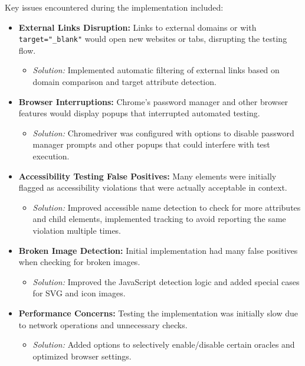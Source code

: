 Key issues encountered during the implementation included:

\begin{itemize}
    \item \textbf{External Links Disruption:} Links to external domains or with \texttt{target="\_blank"} would open new websites or tabs, disrupting the testing flow.
    \begin{itemize}
        \item \textit{Solution:} Implemented automatic filtering of external links based on domain comparison and target attribute detection.
    \end{itemize}
    
    \item \textbf{Browser Interruptions:} Chrome's password manager and other browser features would display popups that interrupted automated testing.
    \begin{itemize}
        \item \textit{Solution:} Chromedriver was configured with options to disable password manager prompts and other popups that could interfere with test execution.
    \end{itemize}
    
    \item \textbf{Accessibility Testing False Positives:} Many elements were initially flagged as accessibility violations that were actually acceptable in context.
    \begin{itemize}
        \item \textit{Solution:} Improved accessible name detection to check for more attributes and child elements, implemented tracking to avoid reporting the same violation multiple times.
    \end{itemize}
    
    \item \textbf{Broken Image Detection:} Initial implementation had many false positives when checking for broken images.
    \begin{itemize}
        \item \textit{Solution:} Improved the JavaScript detection logic and added special cases for SVG and icon images.
    \end{itemize}
    
    \item \textbf{Performance Concerns:} Testing the implementation was initially slow due to network operations and unnecessary checks.
    \begin{itemize}
        \item \textit{Solution:} Added options to selectively enable/disable certain oracles and optimized browser settings.
    \end{itemize}
\end{itemize}


